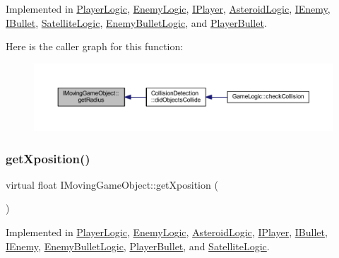 Implemented in \hyperlink{class_player_logic_a2ca2c54d1e07bfc40a08b5c55403af3a}{Player\+Logic}, \hyperlink{class_enemy_logic_ab6736c870e69bc20bef8d6d010946eb2}{Enemy\+Logic}, \hyperlink{class_i_player_a240460b3baeee74029f1fc407493d121}{I\+Player}, \hyperlink{class_asteroid_logic_a575d9f801770906960b65dafe937fba5}{Asteroid\+Logic}, \hyperlink{class_i_enemy_ab1fb8f6320916ef6a1497f9651704d05}{I\+Enemy}, \hyperlink{class_i_bullet_a327968e71126cdea5998076d8919354f}{I\+Bullet}, \hyperlink{class_satellite_logic_a5b86efe041f1d537ec83b9f7dd574b7e}{Satellite\+Logic}, \hyperlink{class_enemy_bullet_logic_a7e473b13bf07fdf8eb76b65e02879bf7}{Enemy\+Bullet\+Logic}, and \hyperlink{class_player_bullet_a1ff56e38b1447500d2887b6fe1eeb674}{Player\+Bullet}.

Here is the caller graph for this function\+:
\nopagebreak
\begin{figure}[H]
\begin{center}
\leavevmode
\includegraphics[width=350pt]{class_i_moving_game_object_ab2120f126d088beda46654aa3ccfd705_icgraph}
\end{center}
\end{figure}
\mbox{\label{class_i_moving_game_object_acc7f0195491b1843558c8c558cbc7363}} 
\subsubsection{\texorpdfstring{get\+Xposition()}{getXposition()}}
{\footnotesize\ttfamily virtual float I\+Moving\+Game\+Object\+::get\+Xposition (\begin{DoxyParamCaption}{ }\end{DoxyParamCaption})\hspace{0.3cm}{\ttfamily [pure virtual]}}



Implemented in \hyperlink{class_player_logic_a9f92defe2d43690329bd6e334fb61e01}{Player\+Logic}, \hyperlink{class_enemy_logic_a7eed969ab8e3d2527cdac04ef39a5aba}{Enemy\+Logic}, \hyperlink{class_asteroid_logic_a1d79a614c5e1a9409404f6a2def25761}{Asteroid\+Logic}, \hyperlink{class_i_player_a9df96a1fd43f35f2579e2ec4a167acfe}{I\+Player}, \hyperlink{class_i_bullet_a20babdd6c657ddda175e84a56564dcfa}{I\+Bullet}, \hyperlink{class_i_enemy_a504ea7fa77b8984d5b9dd71352876943}{I\+Enemy}, \hyperlink{class_enemy_bullet_logic_afe73016d27c33171a20c15e11026106e}{Enemy\+Bullet\+Logic}, \hyperlink{class_player_bullet_aa9462c44892190316ee479a18693b6ad}{Player\+Bullet}, and \hyperlink{class_satellite_logic_a3a35c4c5b5ff051dbfcffc7ce85e40a2}{Satellite\+Logic}.

